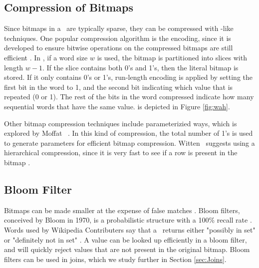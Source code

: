 \subsection{Compression of Bitmaps}
\label{sub:Compression of Bitmaps}
Since bitmaps in a \biti~are typically sparse, they can be compressed with \rle-like techniques. One popular compression algorithm is the  encoding, since it is developed to ensure bitwise operations on the compressed bitmaps are still efficient \cite{Bjorklund2011-wh}. In , if a word size $w$ is used, the bitmap is partitioned into slices with length $w-1$. If the slice contains both 0's and 1's, then the literal bitmap is stored. If it only contains 0's or 1's, run-length encoding is applied by setting the first bit in the word to 1, and the second bit indicating which value that is repeated (0 or 1). The rest of the bits in the word compressed indicate how many sequential words that have the same value.  is depicted in Figure \ref{fig:wah}.

Other bitmap compression techniques include parameterizied ways, which is explored by Moffat \ea~\cite{Moffat1992-tz}. In this kind of compression, the total number of 1's is used to generate parameters for efficient bitmap compression. Witten \ea~suggests using a hierarchical compression, since it is very fast to see if a row is present in the bitmap \cite{Witten1999-qq}. 


\subsection{Bloom Filter}
\label{sub:Bloom Filter}
Bitmaps can be made smaller at the expense of false matches \cite{Witten1999-qq}. Bloom filters, conceived by Bloom in 1970, is a probabilistic structure with a 100\% recall rate \cite{Bloom1970-nr, Wikipedia_contributors2015-lq}. Words used by Wikipedia Contributers say that a \bloom~returns either "possibly in set" or "definitely not in set" \cite{Wikipedia_contributors2015-lq}. A value can be looked up efficiently in a bloom filter, and will quickly reject values that are not present in the original bitmap. Bloom filters can be used in joins, which we study further in Section \ref{sec:Joins}.

